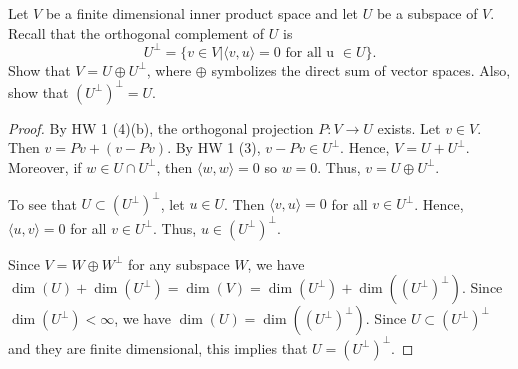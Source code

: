 \documentclass{article}
\begin{document}
 Let $V$ be a finite dimensional inner product space and let $U$ be a subspace of $V$. Recall that the orthogonal complement of $U$ is 
$$U^\perp = \{v \in V | \langle v,u \rangle = 0 \text{ for all u } \in U\}.$$
Show that $V = U \oplus U^\perp$, where $\oplus$ symbolizes the direct sum of vector spaces. Also, show that $(U^\perp)^\perp = U$.
\begin{proof}
By HW 1 (4)(b), the orthogonal projection $P : V \to U$ exists.  Let $v \in V$. Then $v = Pv + (v - Pv)$. By HW 1 (3), $v - Pv \in U^\perp$. Hence, $V = U + U^\perp$.  Moreover, if $w \in U \cap U^\perp$, then $\langle w, w \rangle = 0$ so $w = 0$. Thus, $v = U \oplus U^\perp$.

To see that $U \subset (U^\perp)^\perp$, let  $u \in U$. Then $\langle v,u \rangle = 0$ for all $v \in U^\perp$. Hence, $\langle u,v \rangle = 0$ for all $v \in U^\perp$. Thus, $u \in (U^\perp)^\perp$.

Since $V = W \oplus W^\perp$ for any subspace $W$, we have $\dim (U) + \dim(U^\perp) = \dim (V) = \dim (U^\perp) + \dim((U^\perp)^\perp)$. Since $\dim(U^\perp) < \infty$, we have $\dim(U) = \dim((U^\perp)^\perp)$.  Since $U \subset (U^\perp)^\perp$ and they are finite dimensional, this implies that $U = (U^\perp)^\perp$.

\end{proof}
\end{document}

